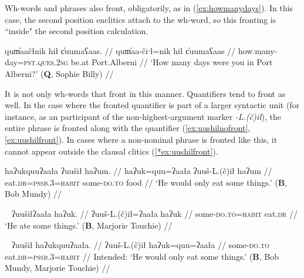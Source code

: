 Wh-words and phrases also front, obligatorily, as in (\ref{ex:howmanydays}). In this case, the second position enclitics attach to the wh-word, so this fronting is ``inside" the second position calculation.

\ex \label{ex:howmanydays}
\begingl
\glpreamble qum̓aačłnik hił c̓uumaʕaas. //
\gla qum̓aa-čiˑł=nik hił c̓uumaʕaas //
\glb how.many-day=\textsc{pst.ques.2sg} be.at Port.Alberni //
\glft `How many days were you in Port Alberni?' (\textbf{Q}, Sophie Billy) //
\endgl
\xe

It is not only wh-words that front in this manner. Quantifiers tend to front as well. In the case where the fronted quantifier is part of a larger syntactic unit (for instance, as an participant of the non-highest-argument marker \textit{-L.(č)ił}), the entire phrase is fronted along with the quantifier (\ref{ex:uushilnofront}, \ref{ex:uushilfront}). In cases where a non-nominal phrase is fronted like this, it cannot appear outside the clausal clitics (\ref{*ex:uushilfront}).

\ex \label{ex:uushilnofront}
\begingl
\glpreamble haʔukquuʔaała ʔuušił haʔum. //
\gla haʔuk=quu=ʔaała ʔuuš-L.(č)ił haʔum //
\glb eat.\textsc{dr}=\textsc{pssb.3}=\textsc{habit} some-\textsc{do.to} food //
\glft `He would only eat some things.' (\textbf{B}, Bob Mundy) //
\endgl
\xe

\ex~ \label{ex:uushilfront}
\begingl
\glpreamble ʔuušiłʔaała haʔuk. //
\gla ʔuuš-L.(č)ił=ʔaała haʔuk  //
\glb some-\textsc{do.to}=\textsc{habit} eat.\textsc{dr} //
\glft `He ate some things.' (\textbf{B}, Marjorie Touchie) //
\endgl
\xe

\ex~ \label{*ex:uushilfront}
\begingl
\glpreamble *ʔuušił haʔukquuʔaała. //
\gla ʔuuš-L.(č)ił haʔuk=quu=ʔaała  //
\glb some-\textsc{do.to} eat.\textsc{dr}=\textsc{pssb.3}=\textsc{habit} //
\glft Intended: `He would only eat some things.' (\textbf{B}, Bob Mundy, Marjorie Touchie) //
\endgl
\xe

\begin{comment}
I have not done a deep investigation into the conditions that determine whether the second position complex falls on the fronted quantifier or on the following predicate. In fact, this may vary by quantifier type. I have examples in my data of the fronted quantifier \textit{ʔuuš} taking the clitics (\ref{ex:uushfrontclitic}) or not (\ref{ex:uushfrontnoclitic}).

\ex \label{ex:uushfrontclitic}
\begingl
\glpreamble k̓umaaw̓it̓asʔaƛquu, n̓aačukitʔišʔaałʔał ʔin hiłʔapitʔaałʔał suč̓as, \textbf{ʔuušʔaƛquu wiikapuƛ}. //
\gla k̓um-(y)aˑ-w̓it̓as=!aƛ=quu, n̓aačuk=(m)it=ʔiˑš=ʔaał=ʔał ʔin hił=!ap=(m)it=ʔaał=ʔał suč̓as, \textbf{ʔuuš=ʔaƛ=quu wiikapuƛ}  //
\glb point-\textsc{cv}-going.to=\textsc{now}=\textsc{pssb.3} look.\textsc{dr}=\textsc{pst}=\textsc{strg.3}=\textsc{habit}=\textsc{pl} \textsc{comp} be.at=\textsc{caus}=\textsc{pst}=\textsc{habit}=\textsc{pl} tree, \textbf{some=\textsc{now}=\textsc{pssb.3} pass.away.\textsc{mo}} //
\glft `If he is going to be pointer, they look to see if they put (someone) in a tree, if someone has passed away.' (\textbf{C}, \textit{tupaat} Julia Lucas) //
\endgl
\xe
\end{comment}

